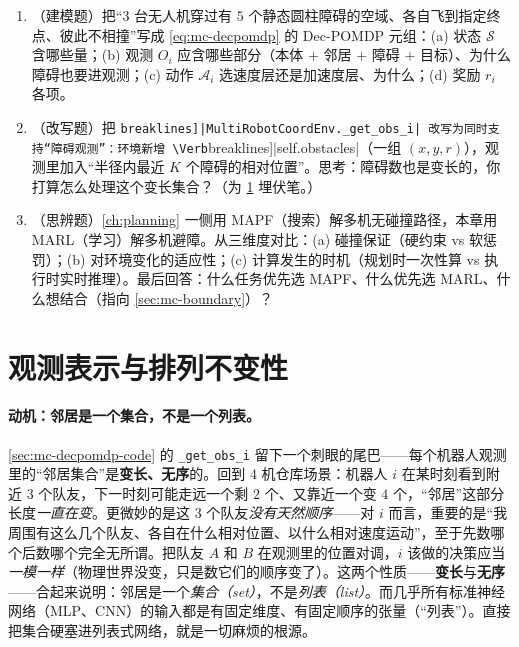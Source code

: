 \begin{practice}
\begin{enumerate}
  \item （建模题）把“$3$ 台无人机穿过有 $5$ 个静态圆柱障碍的空域、各自飞到指定终点、彼此不相撞”写成 \cref{eq:mc-decpomdp} 的 Dec-POMDP 元组：(a) 状态 $\mathcal{S}$ 含哪些量；(b) 观测 $O_i$ 应含哪些部分（本体 $+$ 邻居 $+$ 障碍 $+$ 目标）、为什么障碍也要进观测；(c) 动作 $\mathcal{A}_i$ 选速度层还是加速度层、为什么；(d) 奖励 $r_i$ 各项。
  \item （改写题）把 \Verb[breaklines]|MultiRobotCoordEnv._get_obs_i| 改写为同时支持“障碍观测”：环境新增 \Verb[breaklines]|self.obstacles|（一组 $(x,y,r)$），观测里加入“半径内最近 $K$ 个障碍的相对位置”。思考：障碍数也是变长的，你打算怎么处理这个变长集合？（为 \cref{sec:mc-perminv} 埋伏笔。）
  \item （思辨题）\cref{ch:planning} 一侧用 MAPF（搜索）解多机无碰撞路径，本章用 MARL（学习）解多机避障。从三维度对比：(a) 碰撞保证（硬约束 vs 软惩罚）；(b) 对环境变化的适应性；(c) 计算发生的时机（规划时一次性算 vs 执行时实时推理）。最后回答：什么任务优先选 MAPF、什么优先选 MARL、什么想结合（指向 \cref{sec:mc-boundary}）？
\end{enumerate}
\end{practice}

\section{观测表示与排列不变性}
\label{sec:mc-perminv}

\paragraph{动机：邻居是一个集合，不是一个列表。}
\cref{sec:mc-decpomdp-code} 的 \verb|_get_obs_i| 留下一个刺眼的尾巴——每个机器人观测里的“邻居集合”是\textbf{变长、无序}的。回到 $4$ 机仓库场景：机器人 $i$ 在某时刻看到附近 $3$ 个队友，下一时刻可能走远一个剩 $2$ 个、又靠近一个变 $4$ 个，“邻居”这部分长度\emph{一直在变}。更微妙的是这 $3$ 个队友\emph{没有天然顺序}——对 $i$ 而言，重要的是“我周围有这么几个队友、各自在什么相对位置、以什么相对速度运动”，至于先数哪个后数哪个完全无所谓。把队友 $A$ 和 $B$ 在观测里的位置对调，$i$ 该做的决策应当\emph{一模一样}（物理世界没变，只是数它们的顺序变了）。这两个性质——\textbf{变长}与\textbf{无序}——合起来说明：邻居是一个\emph{集合（set）}，不是\emph{列表（list）}。而几乎所有标准神经网络（MLP、CNN）的输入都是有固定维度、有固定顺序的张量（“列表”）。直接把集合硬塞进列表式网络，就是一切麻烦的根源。

